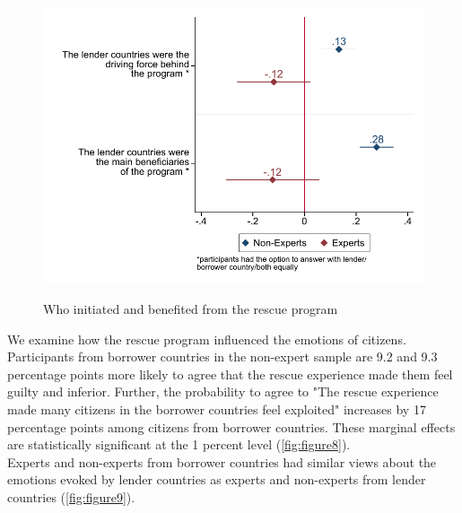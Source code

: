 \begin{figure}[h!] 
\begin{center}
     \caption{Who initiated and benefited from the rescue program}
     \includegraphics[scale=0.8]{Question3_4_base.pdf}
     \label{fig:figure7}
     \end{center}
     \tiny
\end{figure}
We examine how the rescue program influenced the emotions of citizens. Participants from borrower countries in the non-expert sample are 9.2 and 9.3 percentage points more likely to agree that the rescue experience made them feel guilty and inferior. Further, the probability to agree to "The rescue experience made many citizens in the borrower countries feel exploited" increases by 17 percentage points among citizens from borrower countries. These marginal effects are statistically significant at the 1 percent level (\autoref{fig:figure8}).  \\
Experts and non-experts from borrower countries had similar views about the emotions evoked by lender countries as experts and non-experts from lender countries (\autoref{fig:figure9}).  \\


